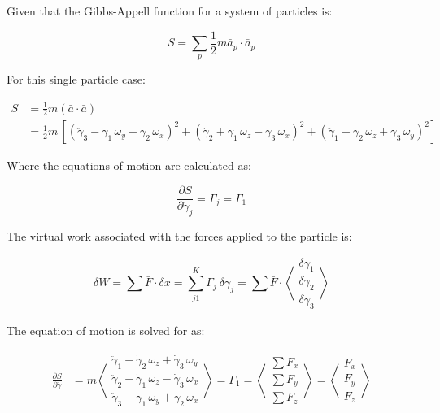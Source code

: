 \documentclass[12pt, letterpaper]{../assignment}
\begin{document}
Given that the Gibbs-Appell function for a system of particles is:

$$ S = \sum_p \frac{1}{2} m \bar{a}_p \cdot \bar{a}_p  $$

For this single particle case:

\begin{equation*}
\begin{aligned}
S &= \frac{1}{2} m \left( \bar{a}\cdot \bar{a} \right) \\
  &= \frac{1}{2}m\,{\left[
                  {{\left({\ddot{\gamma} }_3 -{\dot{\gamma} }_1 \,\omega_y +{\dot{\gamma} }_2 \,\omega_x \right)}}^2 +
                  {{\left({\ddot{\gamma} }_2 +{\dot{\gamma} }_1 \,\omega_z -{\dot{\gamma} }_3 \,\omega_x \right)}}^2+
                  {{\left({\ddot{\gamma} }_1 -{\dot{\gamma} }_2 \,\omega_z +{\dot{\gamma} }_3 \,\omega_y \right)}}^2
                  \right]}
\end{aligned}
\end{equation*}

Where the equations of motion are calculated as:

$$ \frac{\partial S}{\partial \ddot{\gamma}_j} =
\Gamma_j = \Gamma_1 $$ %

The virtual work associated with the forces applied to the particle is:

$$ \delta W = 
\sum \bar{F} \cdot \delta \bar{x} = 
\sum_{j1}^K
\Gamma_j\ \delta \gamma_j = %
\sum \bar{F} \cdot \left<\begin{array}{c}
  \delta \gamma_1 \\
  \delta \gamma_2 \\
  \delta \gamma_3
\end{array}\right> $$ 

The equation of motion is solved for as:

\begin{equation*}
\begin{aligned}
    \frac{\partial S}{\partial \ddot{\gamma}} 
      &= m\left<\begin{array}{c}
{\ddot{\gamma} }_1 -{\dot{\gamma} }_2 \,\omega_z +{\dot{\gamma} }_3 \,\omega_y \\
{\ddot{\gamma} }_2 +{\dot{\gamma} }_1 \,\omega_z -{\dot{\gamma} }_3 \,\omega_x \\
{\ddot{\gamma} }_3 -{\dot{\gamma} }_1 \,\omega_y +{\dot{\gamma} }_2 \,\omega_x 
\end{array}\right>
= \Gamma_1 = 
\left<\begin{array}{c}
  \sum F_x \\
  \sum F_y \\
  \sum F_z
  \end{array}\right>= 
  \left<\begin{array}{c}
    F_x \\
    F_y \\
    F_z
    \end{array}\right>
\end{aligned}
\end{equation*}
\end{document}
